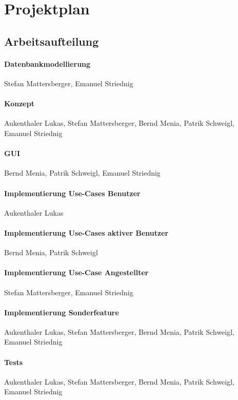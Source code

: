 \newpage
\section{Projektplan}
\subsection{Arbeitsaufteilung}
\paragraph{Datenbankmodellierung}
Stefan Mattersberger, Emanuel Striednig
\paragraph{Konzept}
Aukenthaler Lukas, Stefan Mattersberger, Bernd Menia, Patrik Schweigl, Emanuel Striednig
\paragraph{GUI}
Bernd Menia, Patrik Schweigl, Emanuel Striednig
\paragraph{Implementierung Use-Cases Benutzer}
Aukenthaler Lukas
\paragraph{Implementierung Use-Cases aktiver Benutzer}
Bernd Menia, Patrik Schweigl
\paragraph{Implementierung Use-Case Angestellter}
Stefan Mattersberger, Emanuel Striednig
\paragraph{Implementierung Sonderfeature}
Aukenthaler Lukas, Stefan Mattersberger, Bernd Menia, Patrik Schweigl, Emanuel Striednig
\paragraph{Tests}
Aukenthaler Lukas, Stefan Mattersberger, Bernd Menia, Patrik Schweigl, Emanuel Striednig
\newpage
